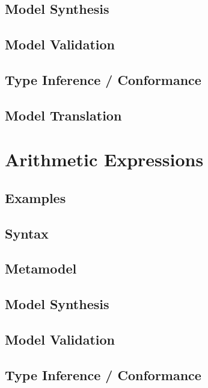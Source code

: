 \documentclass[a4paper,oneside,12pt, extrafontsizes]{memoir}
\begin{document}
    \section{Model Synthesis}

    \section{Model Validation}

    \section{Type Inference / Conformance}

    \section{Model Translation}

  \chapter{Arithmetic Expressions}
  \label{ch:arithmetic}
  

    \section{Examples}
    

    \section{Syntax}
    

    \section{Metamodel}

    \section{Model Synthesis}

    \section{Model Validation}
    

    \section{Type Inference / Conformance}
\end{document}
